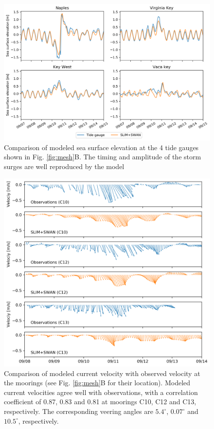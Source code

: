\documentclass[preprint,12pt,authoryear]{elsarticle}
\begin{document}
\begin{figure}
    \centering
    \includegraphics[width=\textwidth]{figures/validation_eta.png}
    \caption{Comparison of modeled sea surface elevation at the 4 tide gauges shown in Fig. \ref{fig:mesh}B. The timing and amplitude of the storm surges are well reproduced by the model}
    \label{fig:sse}
\end{figure}
\begin{figure}
    \includegraphics[width=\textwidth]{figures/figure_currents_all.png}
    \caption{Comparison of modeled current velocity with observed velocity at the moorings (see Fig. \ref{fig:mesh}B for their location). Modeled current velocities agree well with observations, with a correlation coefficient of 0.87, 0.83 and 0.81 at moorings C10, C12 and C13, respectively. The corresponding veering angles are $5.4^\circ$, $0.07^\circ$ and $10.5^\circ$, respectively.}
    \label{fig:uv}
\end{figure}
\end{document}
